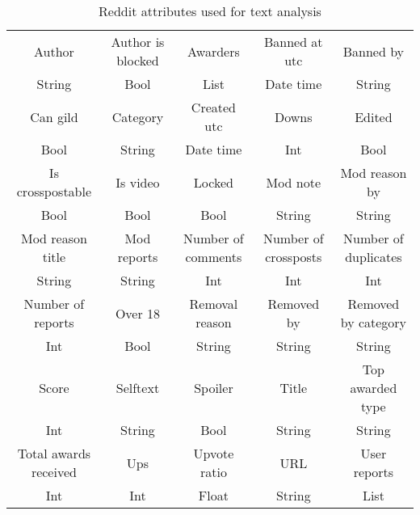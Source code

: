 \begin{landscape}
    \begin{center}
    \begin{table}
      \begin{tabular}{|c|c|c|c|c|}
        \hline
        Author & Author is blocked & Awarders & Banned at utc & Banned by \\
        String & Bool & List & Date time & String\\
        \hline
        Can gild & Category & Created utc & Downs & Edited \\
        Bool & String & Date time & Int & Bool \\
        \hline
        Is crosspostable & Is video & Locked & Mod note & Mod reason by \\
        Bool & Bool & Bool & String & String \\
        \hline
        Mod reason title & Mod reports & Number of comments & Number of crossposts & Number of duplicates \\
        String & String & Int & Int & Int \\
        \hline
        Number of reports & Over 18 & Removal reason & Removed by & Removed by category \\
        Int & Bool & String & String & String \\
        \hline
        Score & \cellcolor{green} Selftext & Spoiler & Title & Top awarded type \\
        Int & \cellcolor{green} String & Bool & String & String \\
        \hline
        Total awards received & Ups & Upvote ratio & URL & User reports \\
        Int & Int & Float & String & List \\
        \hline
      \end{tabular}
      \caption{Reddit attributes used for text analysis}
      \end{table}
    \end{center}
\end{landscape}

